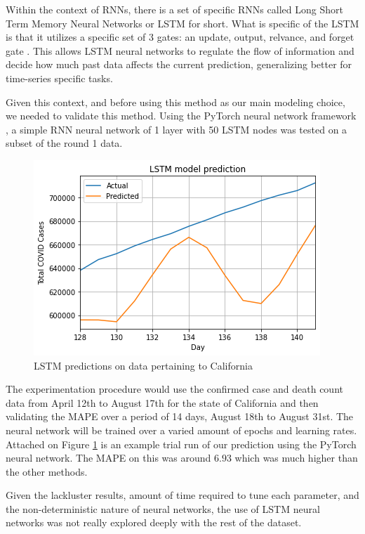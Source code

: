 \documentclass[sigconf,nonacm]{acmart}
\begin{document}
Within the context of RNNs, there is a set of specific RNNs called Long Short
Term Memory Neural Networks or LSTM for short. What is specific of the LSTM is
that it utilizes a specific set of 3 gates: an update, output, relvance, and
forget gate \cite{LSTMlecture}. This allows LSTM neural networks to regulate
the flow of information and decide how much past data affects the current
prediction, generalizing better for time-series specific tasks.

Given this context, and before using this method as our main modeling choice,
we needed to validate this method. Using the PyTorch neural network framework
\cite{Pytorch}, a simple RNN neural network of 1 layer with 50 LSTM nodes was
tested on a subset of the round 1 data. 
\begin{figure}
  \centering
  \includegraphics[width=\linewidth]{figures/LSTMPytorch.png}
  \caption{LSTM predictions on data pertaining to California}
  \label{fig:LSTM_trial}
\end{figure} 

The experimentation procedure would use the confirmed case and death count data
from April 12th to August 17th for the state of California and then validating
the MAPE over a period of 14 days, August 18th to August 31st. The neural
network will be trained over a varied amount of epochs and learning rates. 
Attached on Figure  \ref{fig:LSTM_trial} is an example trial run of our
prediction using the PyTorch neural network. The MAPE on this was around $6.93$
which was much higher than the other methods.

Given the lackluster results, amount of time required to tune each parameter,
and the non-deterministic nature of neural networks, the use of LSTM neural
networks was not really explored deeply with the rest of the dataset.
\end{document}
